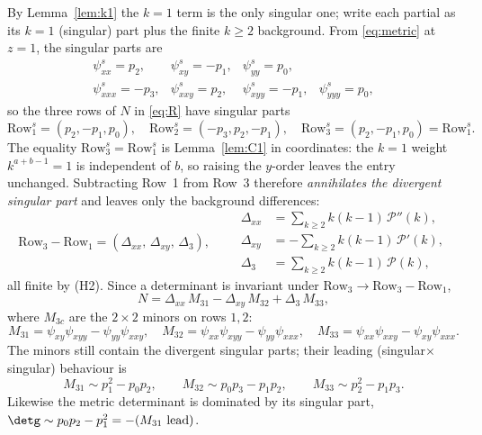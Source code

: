 By Lemma~\ref{lem:k1} the $k=1$ term is the only singular one; write each partial as its
$k=1$ (singular) part plus the finite $k\ge2$ background. From \eqref{eq:metric} at $z=1$,
the singular parts are
\[
\renewcommand{\arraystretch}{1.2}
\begin{array}{llll}
\psi_{xx}^{s}=p_2, & \psi_{xy}^{s}=-p_1, & \psi_{yy}^{s}=p_0, &\\
\psi_{xxx}^{s}=-p_3, & \psi_{xxy}^{s}=p_2, & \psi_{xyy}^{s}=-p_1, & \psi_{yyy}^{s}=p_0,
\end{array}
\]
so the three rows of $N$ in \eqref{eq:R} have singular parts
\[
   \mathrm{Row}_1^{s}=(p_2,-p_1,p_0),\quad
   \mathrm{Row}_2^{s}=(-p_3,p_2,-p_1),\quad
   \mathrm{Row}_3^{s}=(p_2,-p_1,p_0)=\mathrm{Row}_1^{s}.
\]
The equality $\mathrm{Row}_3^{s}=\mathrm{Row}_1^{s}$ is Lemma~\ref{lem:C1} in coordinates: the
$k=1$ weight $k^{a+b-1}=1$ is independent of $b$, so raising the $y$-order leaves the entry
unchanged. Subtracting Row~1 from Row~3 therefore \emph{annihilates the divergent singular part}
and leaves only the background differences:
\begin{equation}\label{eq:rowdiff}
   \mathrm{Row}_3-\mathrm{Row}_1=(\Delta_{xx},\,\Delta_{xy},\,\Delta_3),\qquad
   \begin{aligned}
   \Delta_{xx}&=\textstyle\sum_{k\ge2}k(k-1)\,\mathcal P''(k),\\
   \Delta_{xy}&=-\textstyle\sum_{k\ge2}k(k-1)\,\mathcal P'(k),\\
   \Delta_3&=\textstyle\sum_{k\ge2}k(k-1)\,\mathcal P(k),
   \end{aligned}
\end{equation}
all finite by (H2). Since a determinant is invariant under $\mathrm{Row}_3\to\mathrm{Row}_3-\mathrm{Row}_1$,
\begin{equation}\label{eq:Ncofactor}
   N=\Delta_{xx}\,M_{31}-\Delta_{xy}\,M_{32}+\Delta_3\,M_{33},
\end{equation}
where $M_{3c}$ are the $2\times2$ minors on rows $1,2$:
\[
   M_{31}=\psi_{xy}\psi_{xyy}-\psi_{yy}\psi_{xxy},\quad
   M_{32}=\psi_{xx}\psi_{xyy}-\psi_{yy}\psi_{xxx},\quad
   M_{33}=\psi_{xx}\psi_{xxy}-\psi_{xy}\psi_{xxx}.
\]
The minors still contain the divergent singular parts; their leading (singular$\times$singular)
behaviour is
\begin{equation}\label{eq:minorlead}
   M_{31}\sim p_1^2-p_0p_2,\qquad
   M_{32}\sim p_0p_3-p_1p_2,\qquad
   M_{33}\sim p_2^2-p_1p_3 .
\end{equation}
Likewise the metric determinant is dominated by its singular part,
$\detg\sim p_0p_2-p_1^2=-(M_{31}\text{ lead})$.

